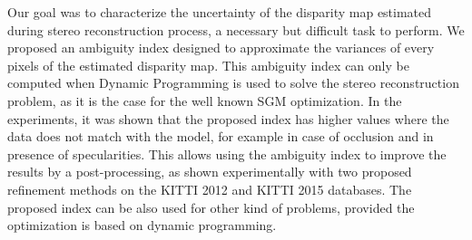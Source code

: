 \documentclass{article}
\begin{document}
Our goal was to characterize the uncertainty of the disparity map estimated during stereo reconstruction process, a necessary but difficult task to perform. We proposed an ambiguity index designed to approximate the variances of every pixels of the estimated disparity map. This ambiguity index can only be computed when Dynamic Programming is used to solve the stereo reconstruction problem, as it is the case for the well known SGM optimization. In the experiments, it was shown that the proposed index has higher values where the data does not match with the model, for example in case of occlusion and in presence of specularities. This allows using the ambiguity index to improve the results by a post-processing, as shown experimentally with two proposed refinement methods on the KITTI 2012 and KITTI 2015 databases.  The proposed index can be also used for other kind of problems, provided the optimization is based on dynamic programming.



\end{document}
